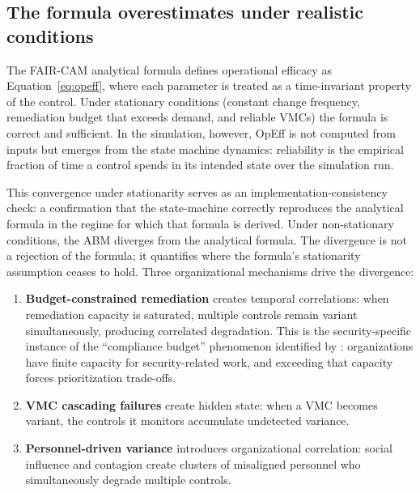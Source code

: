 \documentclass[11pt,a4paper]{article}
\begin{document}
\subsection{The formula overestimates under realistic conditions}
\label{sec:opeffdiv}

The FAIR-CAM analytical formula defines operational efficacy as Equation~\eqref{eq:opeff}, where each parameter is treated as a time-invariant property of the control. Under stationary conditions (constant change frequency, remediation budget that exceeds demand, and reliable VMCs) the formula is correct and sufficient. In the simulation, however, OpEff is not computed from inputs but emerges from the state machine dynamics: reliability is the empirical fraction of time a control spends in its intended state over the simulation run.

This convergence under stationarity serves as an implementation-consistency check: a confirmation that the state-machine correctly reproduces the analytical formula in the regime for which that formula is derived. Under non-stationary conditions, the ABM diverges from the analytical formula. The divergence is not a rejection of the formula; it quantifies where the formula's stationarity assumption ceases to hold. Three organizational mechanisms drive the divergence:
\begin{enumerate}[nosep]
    \item \textbf{Budget-constrained remediation} creates temporal correlations: when remediation capacity is saturated, multiple controls remain variant simultaneously, producing correlated degradation. This is the security-specific instance of the ``compliance budget'' phenomenon identified by \citet{Beautement2008}: organizations have finite capacity for security-related work, and exceeding that capacity forces prioritization trade-offs.
    \item \textbf{VMC cascading failures} create hidden state: when a VMC becomes variant, the controls it monitors accumulate undetected variance.
    \item \textbf{Personnel-driven variance} introduces organizational correlation: social influence and contagion create clusters of misaligned personnel who simultaneously degrade multiple controls.
\end{enumerate}
\end{document}
